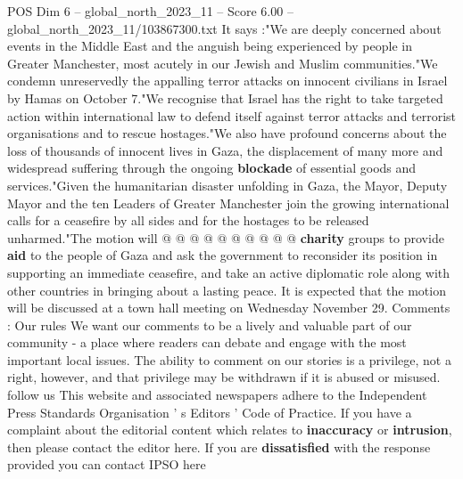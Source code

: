 \begin{textsample}{POS Dim 6 – global\_north\_2023\_11 – Score 6.00 – global\_north\_2023\_11/103867300.txt}
It says :"We are deeply concerned about events in the Middle East and the anguish being experienced by people in Greater Manchester, most acutely in our Jewish and Muslim communities."We condemn unreservedly the appalling terror attacks on innocent civilians in Israel by Hamas on October 7."We recognise that Israel has the right to take targeted action within international law to defend itself against terror attacks and terrorist organisations and to rescue hostages."We also have profound concerns about the loss of thousands of innocent lives in Gaza, the displacement of many more and widespread suffering through the ongoing \textbf{blockade} of essential goods and services."Given the humanitarian disaster unfolding in Gaza, the Mayor, Deputy Mayor and the ten Leaders of Greater Manchester join the growing international calls for a ceasefire by all sides and for the hostages to be released unharmed."The motion will @ @ @ @ @ @ @ @ @ @ \textbf{charity} groups to provide \textbf{aid} to the people of Gaza and ask the government to reconsider its position in supporting an immediate ceasefire, and take an active diplomatic role along with other countries in bringing about a lasting peace.
It is expected that the motion will be discussed at a town hall meeting on Wednesday November 29.
Comments : Our rules We want our comments to be a lively and valuable part of our community - a place where readers can debate and engage with the most important local issues.
The ability to comment on our stories is a privilege, not a right, however, and that privilege may be withdrawn if it is abused or misused. follow us This website and associated newspapers adhere to the Independent Press Standards Organisation ' s Editors ' Code of Practice.
If you have a complaint about the editorial content which relates to \textbf{inaccuracy} or \textbf{intrusion}, then please contact the editor here.
If you are \textbf{dissatisfied} with the response provided you can contact IPSO here

\end{textsample}
